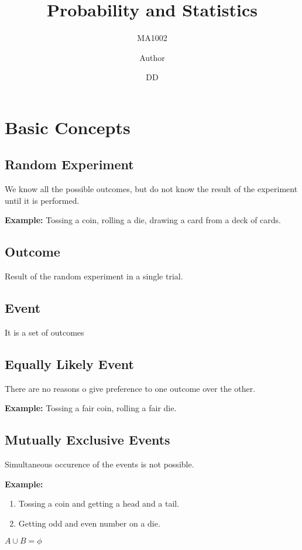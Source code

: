 \documentclass[english,course]{lecture}
\title{Probability and Statistics}
\subtitle{MA1002}
\author{Author}
\date{DD}{MM}{YYYY}
\begin{document}
\newpage






\section{Basic Concepts}

\subsection{Random Experiment}

We know all the possible outcomes, but do not know the result of the experiment until it is performed.

\textbf{Example:} Tossing a coin, rolling a die, drawing a card from a deck of cards.

\subsection{Outcome}

Result of the random experiment in a single trial.

\subsection{Event}

It is a set of outcomes

\subsection{Equally Likely Event}

There are no reasons o give preference to one outcome over the other.

\textbf{Example:} Tossing a fair coin, rolling a fair die.

\subsection{Mutually Exclusive Events}

Simultaneous occurence of the events is not possible.

\textbf{Example:}
\begin{enumerate}
  \item  Tossing a coin and getting a head and a tail. 
  \item Getting odd and even number on a die.
\end{enumerate}

$A \cup B = \phi$
\end{document}
